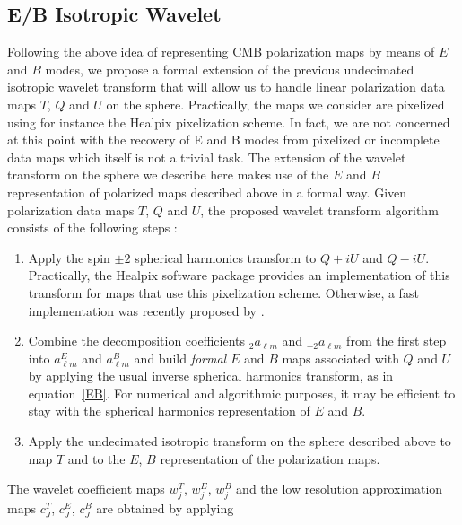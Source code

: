 \subsection{E/B Isotropic Wavelet}
Following the above idea of representing CMB polarization maps by means of $E$ and $B$ modes, we propose a formal extension of the previous 
undecimated isotropic wavelet transform that will allow us to handle linear polarization data maps $T$, $Q$ and $U$ on the sphere. Practically, 
the maps we consider are pixelized using for instance the Healpix pixelization scheme. In fact, we are not concerned at this point with the 
recovery of E and B modes from pixelized or incomplete data maps which itself is not a trivial task. The extension of the wavelet transform 
on the sphere we describe here makes use of the $E$ and $B$ representation of polarized maps described above in a formal way. Given polarization 
data maps $T$, $Q$ and $U$, the proposed wavelet transform algorithm consists of the following steps : 
\vspace{.1cm}
\begin{center}
\begin{minipage}[b]{0.85\linewidth}
\footnotesize{
\begin{enumerate}
\item Apply the spin $\pm 2$ spherical harmonics transform to $Q+iU$ and $Q-iU$. Practically, the Healpix software package provides an implementation 
of this transform for maps that use this pixelization scheme. Otherwise, a fast implementation was recently proposed by \cite{wiauxspin2}.
\item Combine the decomposition coefficients ${ _{2}a_{\ell m}}$ and ${ _{-2}a_{\ell m}}$ from the first step into $a_{\ell m}^E$ and $a_{\ell m}^B$ 
and build \emph{formal} $E$ and $B$ maps associated with $Q$ and $U$ by applying the usual inverse spherical harmonics transform, as in equation~\ref{EB}. 
For numerical and algorithmic purposes, it may be efficient to stay with the spherical harmonics representation of $E$ and $B$.
\item Apply the undecimated isotropic transform on the sphere described above to map $T$ and to the $E$, $B$ representation of the polarization maps. 
\end{enumerate}}
\end{minipage}
\end{center}
\vspace{.1cm}
The wavelet coefficient maps  $w_j^T$, $w_j^E$, $w_j^B$ and the low resolution approximation maps $c_J^T$, $c_J^E$, $c_J^B$ are obtained by applying 

